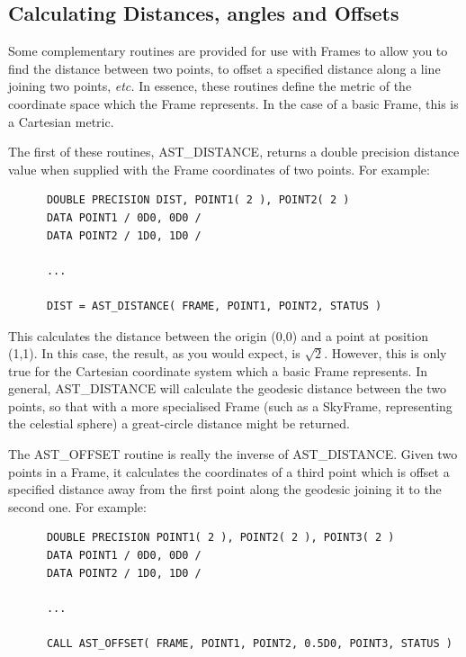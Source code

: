 \documentclass[twoside,11pt]{article}
\newcommand{\htmlref}[2]{#1}
\begin{document}
\subsection{\label{ss:distanceandoffset}Calculating Distances, angles and Offsets}
Some complementary 
routines 
are provided for use with Frames to allow you to find the distance
between two points, to offset a specified distance along a line joining
two points, {\em{etc.}} In essence, these 
routines 
define the metric of the coordinate space which the \htmlref{Frame}{Frame} represents. In
the case of a basic Frame, this is a Cartesian metric.

The first of these routines, \htmlref{AST\_DISTANCE}{AST_DISTANCE}, returns a double precision
distance value when supplied with the Frame coordinates of two
points. For example:

\small
\begin{verbatim}
      DOUBLE PRECISION DIST, POINT1( 2 ), POINT2( 2 )
      DATA POINT1 / 0D0, 0D0 /
      DATA POINT2 / 1D0, 1D0 /

      ...

      DIST = AST_DISTANCE( FRAME, POINT1, POINT2, STATUS )
\end{verbatim}
\normalsize

This calculates the distance between the origin (0,0) and a point at
position (1,1). In this case, the result, as you would expect, is
$\surd{2}$. However, this is only true for the Cartesian coordinate
system which a basic Frame represents. In general, AST\_DISTANCE will
calculate the geodesic distance between the two points, so that with a
more specialised Frame (such as a \htmlref{SkyFrame}{SkyFrame}, representing the celestial
sphere) a great-circle distance might be returned.

The \htmlref{AST\_OFFSET}{AST_OFFSET} routine is really the inverse of AST\_DISTANCE. Given
two points in a Frame, it calculates the coordinates of a third point
which is offset a specified distance away from the first point along
the geodesic joining it to the second one. For example:

\small
\begin{verbatim}
      DOUBLE PRECISION POINT1( 2 ), POINT2( 2 ), POINT3( 2 )
      DATA POINT1 / 0D0, 0D0 /
      DATA POINT2 / 1D0, 1D0 /

      ...

      CALL AST_OFFSET( FRAME, POINT1, POINT2, 0.5D0, POINT3, STATUS )
\end{verbatim}
\normalsize
\end{document}
